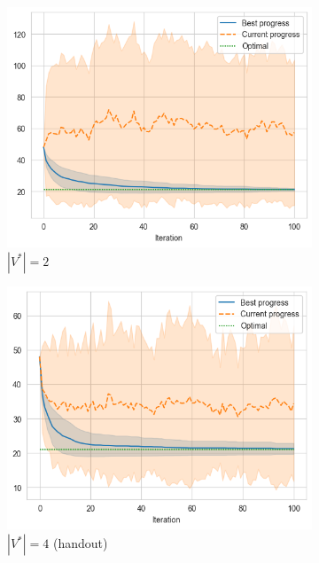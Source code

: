\begin{figure}[ht]
    \centering
    \hfill
    \begin{subfigure}{0.32\textwidth}
        \centering
        \includegraphics[width=\textwidth]{../images/p1/added32s.png}
        \caption{\(|V^*| = 2\)}
    \end{subfigure}
    \hfill
    \begin{subfigure}{0.32\textwidth}
        \centering
        \includegraphics[width=\textwidth]{../images/p1/added34s.png}
        \caption{\(|V^*| = 4\) (handout)}
    \end{subfigure}
    \hfill
    \begin{subfigure}{0.32\textwidth}

\end{subfigure}
\end{figure}
